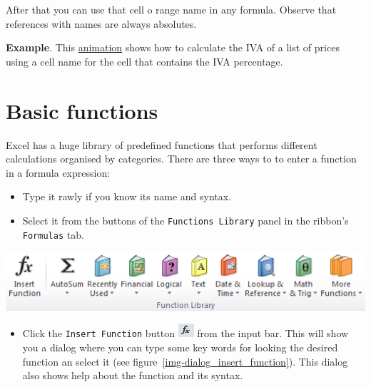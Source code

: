 After that you can use that cell o range name in any formula. Observe that references with names are always absolutes.

\textbf{Example}. This \href{http://aprendeconalf.es/office/excel/manual/img/example_formulas_with_defined_names.gif}{animation} shows how to calculate the IVA of a list of prices using a cell name for the cell that contains the IVA percentage.

\section{Basic functions}\hypertarget{basic-functions}{}\label{basic-functions}

Excel has a huge library of predefined functions that performs different calculations organised by categories. There are three ways to to enter a function in a formula expression:

\begin{itemize}
\item Type it rawly if you know its name and syntax.
\item Select it from the buttons of the \texttt{Functions Library} panel in the ribbon's \texttt{Formulas} tab.
\end{itemize}

\begin{center}
\includegraphics[scale=0.7]{../img/panel_formulas.png}
\end{center}

\begin{itemize}
\item Click the \texttt{Insert Function} button \includegraphics[scale=0.7]{../img/button_insert_function.png} from the
input bar.
This will show you a dialog where you can type some key words for looking the desired function an select it (see
figure~\ref{img-dialog_insert_function}).
This dialog also shows help about the function and its syntax.
\end{itemize}

